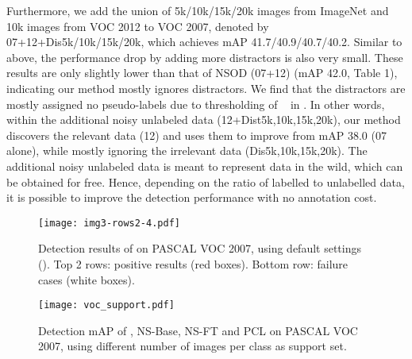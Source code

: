 Furthermore, we add the union of 5k/10k/15k/20k images from ImageNet and 10k images from VOC 2012 to VOC 2007, denoted by 07+12+Dis5k/10k/15k/20k, which achieves mAP 41.7/40.9/40.7/40.2. Similar to above, the performance drop by adding more distractors is also very small. These results are only slightly lower than that of NSOD (07+12) (mAP 42.0, Table 1), indicating our method mostly ignores distractors. We find that the distractors are mostly assigned no pseudo-labels due to thresholding of ~ in \ours. In other words, within the additional noisy unlabeled data (12+Dist5k,10k,15k,20k), our method discovers the relevant data (12) and uses them to improve from mAP 38.0 (07 alone), while mostly ignoring the irrelevant data (\ie Dis5k,10k,15k,20k). The additional noisy unlabeled data is meant to represent data in the wild, which can be obtained for free. Hence, depending on the ratio of labelled to unlabelled data, it is possible to improve the detection performance with no annotation cost.


\begin{figure*}[t]
	\centering
	\texttt{[image: img3-rows2-4.pdf]}
	\caption{\small Detection results of \ours on PASCAL VOC 2007, using default settings ().
		Top 2 rows: positive results (red boxes). Bottom row: failure cases (white boxes).
	}
	\label{Fig:result}
\end{figure*}


\begin{figure}[t]
	\centering
	\texttt{[image: voc\_support.pdf]}
	\caption{\small Detection mAP of \ours, NS-Base, NS-FT and PCL on PASCAL VOC 2007, using different number  of images per class as support set.
	}
	\label{Fig:result_voc_support}
\end{figure}



